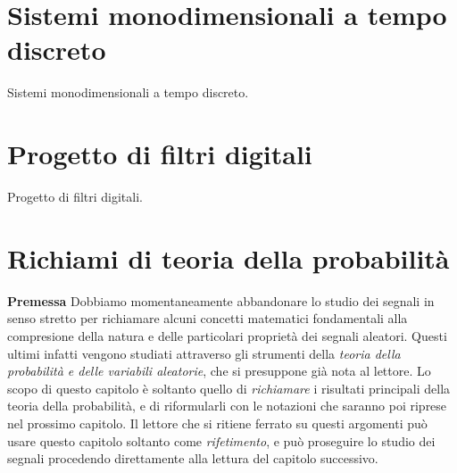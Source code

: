 \documentclass[12pt,oneside,openany]{memoir}
\numberwithin{equation}{subsection}
\begin{document}
\section{Sistemi monodimensionali a tempo discreto}
Sistemi monodimensionali a tempo discreto.


\section{Progetto di filtri digitali}
Progetto di filtri digitali.


\newpage
\section{Richiami di teoria della probabilit\`a}
\textbf{Premessa}
\bigbreak
\noindent
Dobbiamo momentaneamente abbandonare lo studio dei segnali in senso stretto per
richiamare alcuni concetti matematici fondamentali alla compresione della natura
e delle particolari propriet\`a dei segnali aleatori. Questi ultimi infatti
vengono studiati attraverso gli strumenti della \textit{teoria della
probabilit\`a e delle variabili aleatorie}, che si presuppone gi\`a nota al
lettore. Lo scopo di questo capitolo \`e soltanto quello di \textit{richiamare}
i risultati principali della teoria della probabilit\`a, e di riformularli con
le notazioni che saranno poi riprese nel prossimo capitolo. Il lettore che si
ritiene ferrato su questi argomenti pu\`o usare questo capitolo soltanto come
\textit{rifetimento}, e pu\`o proseguire lo studio dei segnali procedendo
direttamente alla lettura del capitolo successivo.

\end{document}

